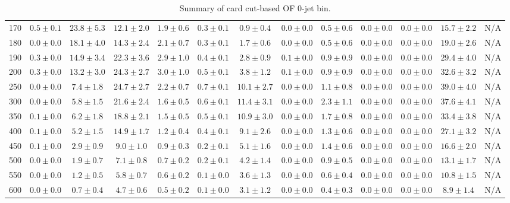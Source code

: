 \begin{table}
{\begin{center}
\begin{tabular}{l | c c | c c c c c c c c  | c c}
170 & $0.5\pm0.1$ & $23.8\pm5.3$ & $12.1\pm2.0$ & $1.9\pm0.6$ & $0.3\pm0.1$ & $0.9\pm0.4$ & $0.0\pm0.0$ & $0.5\pm0.6$ & $0.0\pm0.0$ & $0.0\pm0.0$ & $15.7\pm2.2$ & N/A \\
180 & $0.0\pm0.0$ & $18.1\pm4.0$ & $14.3\pm2.4$ & $2.1\pm0.7$ & $0.3\pm0.1$ & $1.7\pm0.6$ & $0.0\pm0.0$ & $0.5\pm0.6$ & $0.0\pm0.0$ & $0.0\pm0.0$ & $19.0\pm2.6$ & N/A \\
190 & $0.3\pm0.0$ & $14.9\pm3.4$ & $22.3\pm3.6$ & $2.9\pm1.0$ & $0.4\pm0.1$ & $2.8\pm0.9$ & $0.1\pm0.0$ & $0.9\pm0.9$ & $0.0\pm0.0$ & $0.0\pm0.0$ & $29.4\pm4.0$ & N/A \\
200 & $0.3\pm0.0$ & $13.2\pm3.0$ & $24.3\pm2.7$ & $3.0\pm1.0$ & $0.5\pm0.1$ & $3.8\pm1.2$ & $0.1\pm0.0$ & $0.9\pm0.9$ & $0.0\pm0.0$ & $0.0\pm0.0$ & $32.6\pm3.2$ & N/A \\
250 & $0.0\pm0.0$ & $7.4\pm1.8$ & $24.7\pm2.7$ & $2.2\pm0.7$ & $0.7\pm0.1$ & $10.1\pm2.7$ & $0.0\pm0.0$ & $1.1\pm0.8$ & $0.0\pm0.0$ & $0.0\pm0.0$ & $39.0\pm4.0$ & N/A \\
300 & $0.0\pm0.0$ & $5.8\pm1.5$ & $21.6\pm2.4$ & $1.6\pm0.5$ & $0.6\pm0.1$ & $11.4\pm3.1$ & $0.0\pm0.0$ & $2.3\pm1.1$ & $0.0\pm0.0$ & $0.0\pm0.0$ & $37.6\pm4.1$ & N/A \\
350 & $0.1\pm0.0$ & $6.2\pm1.8$ & $18.8\pm2.1$ & $1.5\pm0.5$ & $0.5\pm0.1$ & $10.9\pm3.0$ & $0.0\pm0.0$ & $1.7\pm0.8$ & $0.0\pm0.0$ & $0.0\pm0.0$ & $33.4\pm3.8$ & N/A \\
400 & $0.1\pm0.0$ & $5.2\pm1.5$ & $14.9\pm1.7$ & $1.2\pm0.4$ & $0.4\pm0.1$ & $9.1\pm2.6$ & $0.0\pm0.0$ & $1.3\pm0.6$ & $0.0\pm0.0$ & $0.0\pm0.0$ & $27.1\pm3.2$ & N/A \\
450 & $0.1\pm0.0$ & $2.9\pm0.9$ & $9.0\pm1.0$ & $0.9\pm0.3$ & $0.2\pm0.1$ & $5.1\pm1.6$ & $0.0\pm0.0$ & $1.4\pm0.6$ & $0.0\pm0.0$ & $0.0\pm0.0$ & $16.6\pm2.0$ & N/A \\
500 & $0.0\pm0.0$ & $1.9\pm0.7$ & $7.1\pm0.8$ & $0.7\pm0.2$ & $0.2\pm0.1$ & $4.2\pm1.4$ & $0.0\pm0.0$ & $0.9\pm0.5$ & $0.0\pm0.0$ & $0.0\pm0.0$ & $13.1\pm1.7$ & N/A \\
550 & $0.0\pm0.0$ & $1.2\pm0.5$ & $5.8\pm0.7$ & $0.6\pm0.2$ & $0.1\pm0.0$ & $3.6\pm1.3$ & $0.0\pm0.0$ & $0.6\pm0.4$ & $0.0\pm0.0$ & $0.0\pm0.0$ & $10.8\pm1.5$ & N/A \\
600 & $0.0\pm0.0$ & $0.7\pm0.4$ & $4.7\pm0.6$ & $0.5\pm0.2$ & $0.1\pm0.0$ & $3.1\pm1.2$ & $0.0\pm0.0$ & $0.4\pm0.3$ & $0.0\pm0.0$ & $0.0\pm0.0$ & $8.9\pm1.4$ & N/A \\
\hline
\end{tabular}
\end{center}
}
\caption{Summary of card cut-based OF 0-jet bin.}
\end{table}
